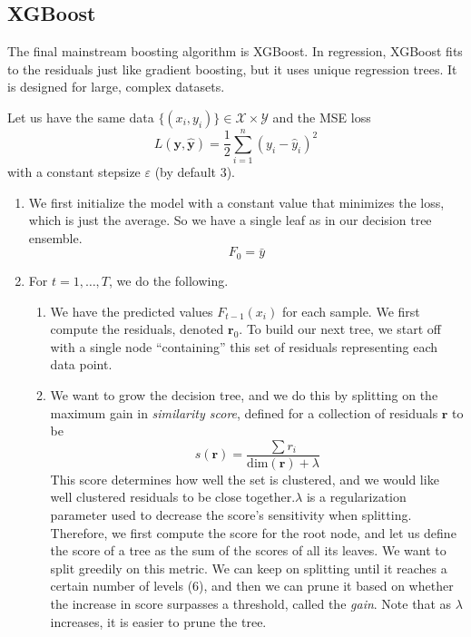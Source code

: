 \documentclass{article}
\begin{document}
  \subsection{XGBoost} 

    The final mainstream boosting algorithm is XGBoost. In regression, XGBoost fits to the residuals just like gradient boosting, but it uses unique regression trees. It is designed for large, complex datasets. 

    \begin{definition} 
      Let us have the same data $\{(x_i, y_i)\} \in \mathcal{X} \times \mathcal{Y}$ and the MSE loss 
      \begin{equation}
        L(\mathbf{y}, \hat{\mathbf{y}}) = \frac{1}{2} \sum_{i=1}^n (y_i - \hat{y}_i)^2
      \end{equation}
      with a constant stepsize $\varepsilon$ (by default $3$). 

      \begin{enumerate}
        \item We first initialize the model with a constant value that minimizes the loss, which is just the average. So we have a single leaf as in our decision tree ensemble. 
          \begin{equation}
            F_0 = \bar{y}
          \end{equation}

        \item For $t = 1, \ldots, T$, we do the following. 
          \begin{enumerate}
            \item We have the predicted values $F_{t-1}(x_i)$ for each sample. We first compute the residuals, denoted $\mathbf{r}_0$. To build our next tree, we start off with a single node ``containing'' this set of residuals representing each data point. 

            \item We want to grow the decision tree, and we do this by splitting on the maximum gain in \textit{similarity score}, defined for a collection of residuals $\mathbf{r}$ to be 
            \begin{equation}
              s(\mathbf{r}) = \frac{\sum r_i}{\mathrm{dim}(\mathbf{r}) + \lambda}
            \end{equation}
            This score determines how well the set is clustered, and we would like well clustered residuals to be close together.$\lambda$ is a regularization parameter used to decrease the score's sensitivity when splitting. Therefore, we first compute the score for the root node, and let us define the score of a tree as the sum of the scores of all its leaves. We want to split greedily on this metric. We can keep on splitting until it reaches a certain number of levels (6), and then we can prune it based on whether the increase in score surpasses a threshold, called the \textit{gain}. Note that as $\lambda$ increases, it is easier to prune the tree. 


\end{enumerate}
\end{enumerate}
\end{definition}
\end{document}

